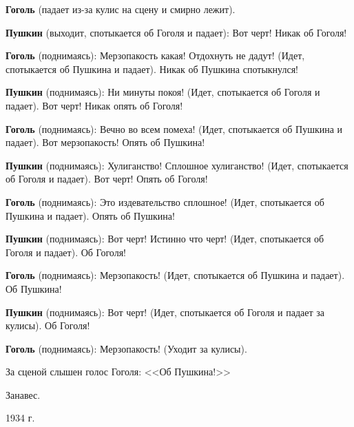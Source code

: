 \textbf{Гоголь} (падает из-за кулис на сцену и смирно лежит).

\textbf{Пушкин} (выходит, спотыкается об Гоголя и падает): Вот черт! Никак об Гоголя!

\textbf{Гоголь} (поднимаясь): Мерзопакость какая! Отдохнуть не дадут! (Идет, спотыкается об Пушкина и падает). Никак об Пушкина спотыкнулся!

\textbf{Пушкин} (поднимаясь): Ни минуты покоя! (Идет, спотыкается об Гоголя и падает). Вот черт! Никак опять об Гоголя!

\textbf{Гоголь} (поднимаясь): Вечно во всем помеха! (Идет, спотыкается об Пушкина и падает). Вот мерзопакость! Опять об Пушкина!

\textbf{Пушкин} (поднимаясь): Хулиганство! Сплошное хулиганство! (Идет, спотыкается об Гоголя и падает). Вот черт! Опять об Гоголя!

\textbf{Гоголь} (поднимаясь): Это издевательство сплошное! (Идет, спотыкается об Пушкина и падает). Опять об Пушкина!

\textbf{Пушкин} (поднимаясь): Вот черт! Истинно что черт! (Идет, спотыкается об Гоголя и падает). Об Гоголя!

\textbf{Гоголь} (поднимаясь): Мерзопакость! (Идет, спотыкается об Пушкина и падает). Об Пушкина!

\textbf{Пушкин} (поднимаясь): Вот черт! (Идет, спотыкается об Гоголя и падает за кулисы). Об Гоголя!

\textbf{Гоголь} (поднимаясь): Мерзопакость! (Уходит за кулисы).

За сценой слышен голос Гоголя: <<Об Пушкина!>>

Занавес.

1934 г.